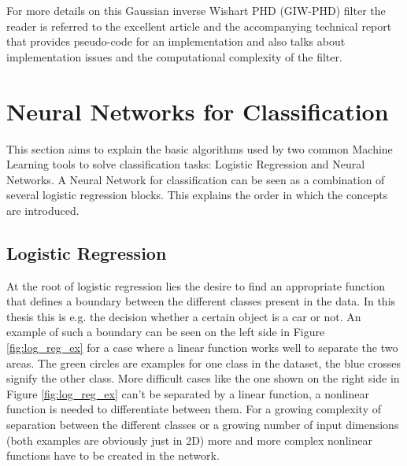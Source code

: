 For more details on this Gaussian inverse Wishart PHD (GIW-PHD) filter the reader is referred to the excellent article \cite{granstrEllipPHD2012} and the accompanying technical report \cite{giwphdtechnical} that provides pseudo-code for an implementation and also talks about implementation issues and the computational complexity of the filter.

\section{Neural Networks for Classification}
This section aims to explain the basic algorithms used by two common Machine Learning tools to solve classification tasks: Logistic Regression and Neural Networks. A Neural Network for classification can be seen as a combination of several logistic regression blocks. This explains the order in which the concepts are introduced. 

\subsection{Logistic Regression}
At the root of logistic regression lies the desire to find an appropriate function that defines a boundary between the different classes present in the data. In this thesis this is e.g. the decision whether a certain object is a car or not. An example of such a boundary can be seen on the left side in Figure \ref{fig:log_reg_ex} for a case where a linear function works well to separate the two areas. The green circles are examples for one class in the dataset, the blue crosses signify the other class. More difficult cases like the one shown on the right side in Figure \ref{fig:log_reg_ex} can't be separated by a linear function, a nonlinear function is needed to differentiate between them. For a growing complexity of separation between the different classes or a growing number of input dimensions (both examples are obviously just in 2D) more and more complex nonlinear functions have to be created in the network. 

